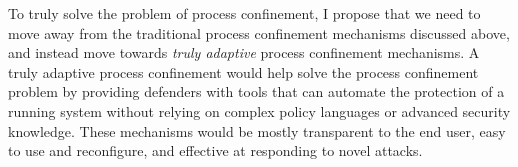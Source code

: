 \documentclass[dvipsnames, 12pt]{article}
\begin{document}
To truly solve the problem of process confinement, I propose that we need to
move away from the traditional process confinement mechanisms discussed above,
and instead move towards \textit{truly adaptive} process confinement mechanisms.
A truly adaptive process confinement would help solve the process confinement
problem by providing defenders with tools that can automate the protection of
a running system without relying on complex policy languages or advanced
security knowledge. These mechanisms would be mostly transparent to the end
user, easy to use and reconfigure, and effective at responding to novel attacks.

%
\end{document}
